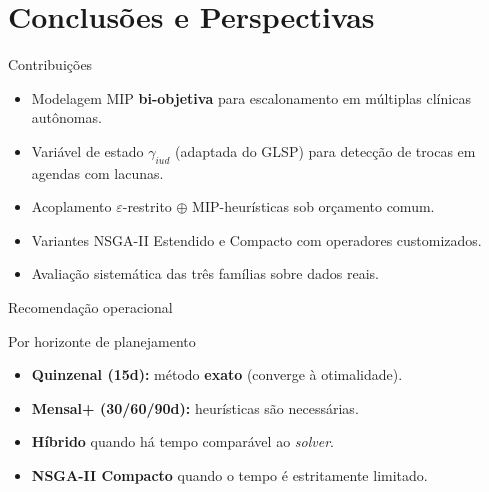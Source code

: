 \section{Conclusões e Perspectivas}

\begin{frame}{Contribuições}
    \begin{block}{}
        \begin{itemize}
            \item Modelagem MIP \textbf{bi-objetiva} para escalonamento em múltiplas clínicas autônomas.
            \item Variável de estado $\gamma_{iud}$ (adaptada do GLSP) para detecção de trocas em agendas com lacunas.
            \item Acoplamento $\varepsilon$-restrito $\oplus$ MIP-heurísticas sob orçamento comum.
            \item Variantes NSGA-II Estendido e Compacto com operadores customizados.
            \item Avaliação sistemática das três famílias sobre dados reais.
        \end{itemize}
    \end{block}
\end{frame}

\begin{frame}{Recomendação operacional}
    \begingroup
    \begin{block}{Por horizonte de planejamento}
        \begin{itemize}
            \item \textbf{Quinzenal (15d):} método \textbf{exato} (converge à otimalidade).
            \item \textbf{Mensal+ (30/60/90d):} heurísticas são necessárias.
            \item \textbf{Híbrido} quando há tempo comparável ao \textit{solver}.
            \item \textbf{NSGA-II Compacto} quando o tempo é estritamente limitado.
        \end{itemize}
    \end{block}
    \endgroup
\end{frame}

